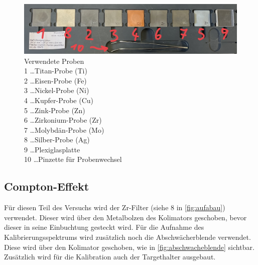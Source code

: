 \documentclass[12pt,english,ngerman]{scrartcl}
\begin{document}
\begin{figure}[H]
	\begin{center}
		\includegraphics[width =\textwidth]{./figures/proben.jpg}
	\end{center}
	\caption[Verwendete Proben]
	{Verwendete Proben\\
	1 \dots Titan-Probe (Ti)\\
	2 \dots Eisen-Probe (Fe) \\
	3 \dots Nickel-Probe (Ni)\\
	4 \dots Kupfer-Probe (Cu)\\
	5 \dots Zink-Probe (Zn)\\
	6 \dots Zirkonium-Probe (Zr)\\
	7 \dots Molybdän-Probe (Mo)\\
	8 \dots Silber-Probe (Ag)\\
	9 \dots Plexiglasplatte \\
	10 \dots Pinzette für Probenwechsel
	}\label{fig:proben}
\end{figure}

\subsection{Compton-Effekt}

Für diesen Teil des Versuchs wird der Zr-Filter (siehe 8 in \autoref{fig:aufabau}) verwendet.
Dieser wird über den Metalbolzen des Kolimators geschoben, bevor dieser in seine Einbuchtung gesteckt wird.
Für die Aufnahme des Kalibrierungsspektrums wird zusätzlich noch die Abschwächerblende verwendet. Diese wird 
über den Kolimator geschoben, wie in \autoref{fig:abschwacheblende} sichtbar. Zusätzlich wird für
die Kalibration auch der Targethalter ausgebaut.
\end{document}
